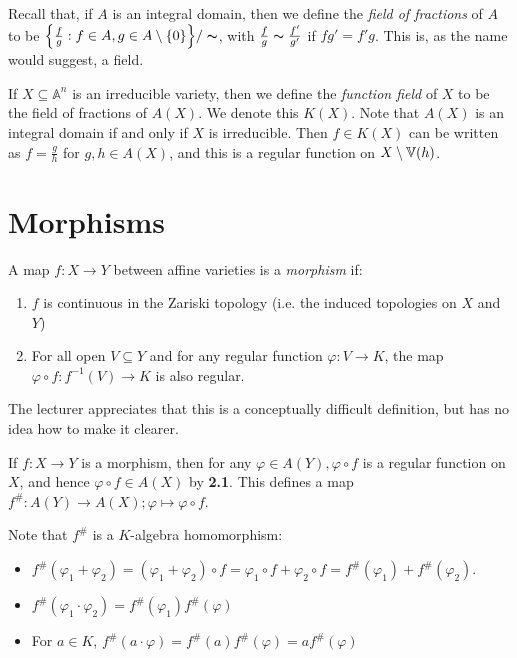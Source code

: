 \documentclass[10pt,a4paper,rgb]{article}
\begin{document}
Recall that, if $A$ is an integral domain, then we define the \emph{field of fractions} of $A$ to be $\Big\{\frac{f}{g} : f \in A, g \in A \setminus\{0\}\Big\}/\thicksim$, with $\frac{f}{g} \thicksim \frac{f'}{g'}$ if $fg' = f'g$. This is, as the name would suggest, a field.

If $X \subseteq \mathbb{A}^n$ is an irreducible variety, then we define the \emph{function field} of $X$ to be the field of fractions of $A(X)$. We denote this $K(X)$. Note that $A(X)$ is an integral domain if and only if $X$ is irreducible. Then $f \in K(X)$ can be written as $f=\frac{g}{h}$ for $g,h \in A(X)$, and this is a regular function on $X \setminus \mathbb{V}(h)$.

\section{Morphisms}
A map $f:X \to Y$ between affine varieties is a \emph{morphism} if:
\begin{enumerate}
\item $f$ is continuous in the Zariski topology (i.e. the induced topologies on $X$ and $Y$)
\item For all open $V \subseteq Y$ and for any regular function $\varphi: V \to K$, the map $\varphi \circ f: f^{-1}(V) \to K$ is also regular.
\end{enumerate}
The lecturer appreciates that this is a conceptually difficult definition, but has no idea how to make it clearer.

If $f:X \to Y$ is a morphism, then for any $\varphi \in A(Y), \varphi\circ f$ is a regular function on $X$, and hence $\varphi \circ f \in A(X)$ by \textbf{2.1}. This defines a map $f^{\#}:A(Y) \to A(X); \varphi \mapsto \varphi\circ f$.

Note that $f^{\#}$ is a $K$-algebra homomorphism:
\begin{itemize}
\item $f^{\#}(\varphi_1+\varphi_2) = (\varphi_1+\varphi_2)\circ f = \varphi_1 \circ f + \varphi_2 \circ f = f^{\#}(\varphi_1) + f^{\#}(\varphi_2)$.
\item $f^{\#}(\varphi_1\cdot\varphi_2) = f^{\#}(\varphi_1)f^{\#}(\varphi)$
\item For $a \in K$, $f^{\#}(a \cdot \varphi) = f^{\#}(a)f^{\#}(\varphi) = af^{\#}(\varphi)$
\end{itemize}
\end{document}
